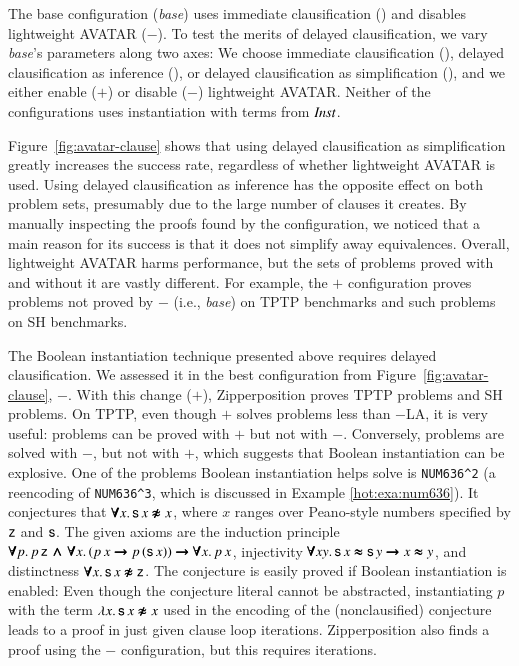 The base configuration (\emph{base}) uses immediate clausification () and 
disables lightweight AVATAR ($-$). To test
the merits of delayed clausification, we vary \emph{base}'s parameters along two axes: We
choose immediate clausification (), delayed clausification as inference
(), or delayed clausification as simplification (), and we
either enable ($+$) or disable ($-$) lightweight AVATAR.
Neither of the configurations uses instantiation with terms from $\mathit{Inst}$.

Figure~\ref{fig:avatar-clause} shows that using delayed clausification as
simplification greatly increases the success rate, regardless of whether
lightweight AVATAR is used. Using delayed clausification as inference has the
opposite effect on both problem sets, presumably due to the large number of
clauses it creates. By manually inspecting the  proofs found by the 
configuration, we noticed that a main reason for its success is that it does
not simplify away equivalences.
%
Overall, lightweight AVATAR harms performance, but the sets of
problems proved with and without it are vastly different. For example,
the $+$ configuration proves  problems not
proved by $-$ (i.e., \emph{base}) on TPTP benchmarks and
 such problems on SH benchmarks.

The Boolean instantiation technique presented above requires delayed
clausification.
We assessed it in the best configuration from
Figure~\ref{fig:avatar-clause}, $-$. With this change ($+$),
Zipperposition proves  TPTP problems and  SH
problems.
On TPTP, even though $+$ solves  problems less
than $-$LA, it is very useful: 
problems can be proved with $+$ but not with $-$. 
Conversely,  problems are solved with $-$,
but not with $+$, which suggests that Boolean instantiation can be 
explosive.
%
One of the problems Boolean instantiation helps solve is \texttt{NUM636\^{}2} (a
reencoding of \texttt{NUM636\^{}3}, which is discussed in Example \ref{hot:exa:num636}).
It conjectures that $\pmb{\forall} x.\, \mathsf{s} \, x \pmb{\not\approx} x$, where $x$ ranges over
Peano-style numbers specified by $\mathsf{z}$ and $\mathsf{s}$. The given axioms are
the induction principle $\pmb{\forall} p.\, p \, \mathsf{z} \,\pmb{\land}\, \pmb{\forall} x. \, (p \,
x \pmb{\rightarrow} p \, (\mathsf{s} \, x)) \pmb{\rightarrow} \pmb{\forall} x. \, p\, x$, injectivity
$\pmb{\forall} x y. \, \mathsf{s}\,x \pmb{\approx} \mathsf{s}\,y \pmb{\rightarrow} x \pmb{\approx} y$, and
distinctness $\pmb{\forall} x. \, \mathsf{s}\,x \pmb{\not\approx} \mathsf{z}$. The conjecture is easily
proved if Boolean instantiation is enabled: Even though the conjecture literal
cannot be abstracted, instantiating $p$ with the term $\lambda x.\, \mathsf{s}
\, x \pmb{\not\approx} x$ used in the encoding of the (nonclausified) conjecture leads to a proof in just
 given clause loop iterations. Zipperposition also finds a
proof using the $-$ configuration, but this requires
 iterations.

